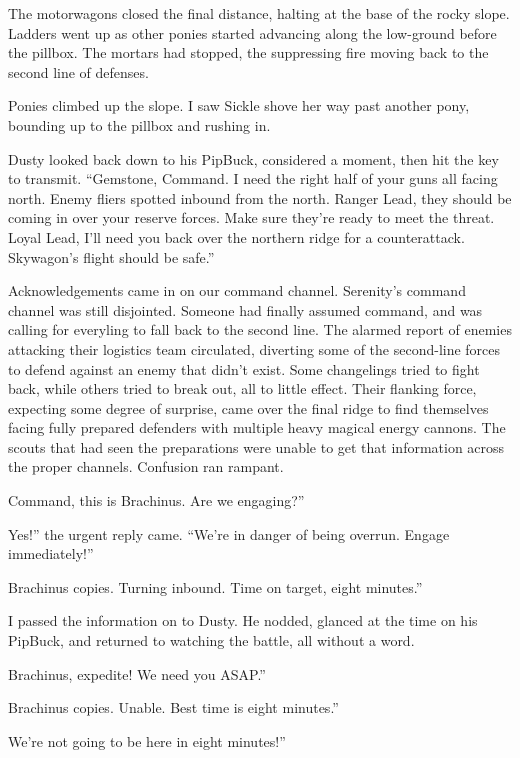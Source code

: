 The motorwagons closed the final distance, halting at the base of the rocky slope. Ladders went up as other ponies started advancing along the low-ground before the pillbox. The mortars had stopped, the suppressing fire moving back to the second line of defenses.

Ponies climbed up the slope. I saw Sickle shove her way past another pony, bounding up to the pillbox and rushing in.

Dusty looked back down to his PipBuck, considered a moment, then hit the key to transmit. “Gemstone, Command. I need the right half of your guns all facing north. Enemy fliers spotted inbound from the north. Ranger Lead, they should be coming in over your reserve forces. Make sure they’re ready to meet the threat. Loyal Lead, I’ll need you back over the northern ridge for a counterattack. Skywagon’s flight should be safe.”

Acknowledgements came in on our command channel. Serenity’s command channel was still disjointed. Someone had finally assumed command, and was calling for everyling to fall back to the second line. The alarmed report of enemies attacking their logistics team circulated, diverting some of the second-line forces to defend against an enemy that didn’t exist. Some changelings tried to fight back, while others tried to break out, all to little effect. Their flanking force, expecting some degree of surprise, came over the final ridge to find themselves facing fully prepared defenders with multiple heavy magical energy cannons. The scouts that had seen the preparations were unable to get that information across the proper channels. Confusion ran rampant.

\leavevmode{}Command, this is Brachinus. Are we engaging?”

\leavevmode{}Yes!” the urgent reply came. “We’re in danger of being overrun. Engage immediately!”

\leavevmode{}Brachinus copies. Turning inbound. Time on target, eight minutes.”

I passed the information on to Dusty. He nodded, glanced at the time on his PipBuck, and returned to watching the battle, all without a word.

\leavevmode{}Brachinus, expedite! We need you ASAP.”

\leavevmode{}Brachinus copies. Unable. Best time is eight minutes.”

\leavevmode{}We’re not going to be here in eight minutes!”

